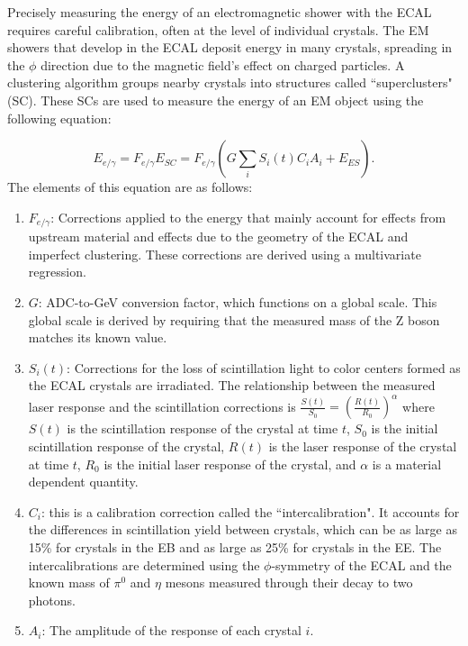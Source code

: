 Precisely measuring the energy of an electromagnetic shower with the ECAL requires careful calibration, often at the level of individual crystals. The EM showers that develop in the ECAL deposit energy in many crystals, spreading in the $\phi$ direction due to the magnetic field's effect on charged particles. A clustering algorithm groups nearby crystals into structures called ``superclusters" (SC). These SCs are used to measure the energy of an EM object using the following equation:

\begin{equation}
    E_{e/\gamma} = F_{e/\gamma} E_{SC} =  F_{e/\gamma} ( G \sum_i S_i(t) C_i A_i + E_{ES} ).
    \label{eqn:ecal_energy}
\end{equation}
The elements of this equation are as follows:

\begin{enumerate}
    \item $F_{e/\gamma}$: Corrections applied to the energy that mainly account for effects from upstream material and effects due to the geometry of the ECAL and imperfect clustering. These corrections are derived using a multivariate regression.
    \item $G$: ADC-to-GeV conversion factor, which functions on a global scale. This global scale is derived by requiring that the measured mass of the Z boson matches its known value\cite{pdg}.
    \item $S_i(t)$: Corrections for the loss of scintillation light to color centers formed as the ECAL crystals are irradiated. The relationship between the measured laser response and the scintillation corrections is $\frac{S(t)}{S_0} = \left(\frac{R(t)}{R_0}\right)^{\alpha}$ where $S(t)$ is the scintillation response of the crystal at time $t$, $S_0$ is the initial scintillation response of the crystal, $R(t)$ is the laser response of the crystal at time $t$, $R_0$ is the initial laser response of the crystal, and $\alpha$ is a material dependent quantity.
    \item $C_i$: this is a calibration correction called the ``intercalibration". It accounts for the differences in scintillation yield between crystals, which can be as large as 15\% for crystals in the EB and as large as 25\% for crystals in the EE. The intercalibrations are determined using the $\phi$-symmetry of the ECAL and the known mass of $\pi^0$ and $\eta$ mesons measured through their decay to two photons.
    \item $A_i$: The amplitude of the response of each crystal $i$. 
\end{enumerate}

